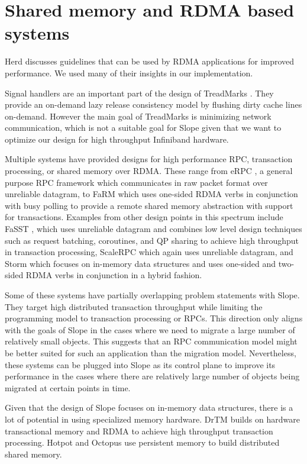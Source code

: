 \section{Shared memory and RDMA based systems}
Herd \cite{kalia2016designguidelines} discusses guidelines that can be
used by RDMA applications for improved performance. We used many of their
insights in our implementation.


Signal handlers are an important part of the design of TreadMarks
\cite{amza1996treadmarks}. They provide an on-demand lazy release
consistency model by flushing dirty cache lines on-demand. However the main
goal of TreadMarks is minimizing
network communication, which is not a suitable goal for Slope given that we
want to optimize our design for high throughput Infiniband hardware.

Multiple systems have provided designs
for high performance RPC, transaction processing, or shared memory over
RDMA. These range from eRPC \cite{kalia2019datacenter}, a general purpose
RPC framework which communicates in raw packet format over unreliable
datagram, to FaRM \cite{Dragojevic2014FaRM} which uses one-sided RDMA
verbs in conjunction with busy polling to provide a remote shared memory
abstraction with support for transactions. Examples from other design
points in this spectrum include FaSST \cite{kalia2016fasst}, which uses
unreliable datagram and combines low level design techniques such as
request batching, coroutines, and QP sharing to achieve high throughput
in transaction processing, ScaleRPC \cite{ScaleRPC2019} which again uses unreliable datagram,
and Storm \cite{novakovic2019storm} which
focuses on in-memory data structures and uses
one-sided and two-sided RDMA verbs in conjunction in a hybrid fashion.

Some of these systems have partially overlapping problem statements with
Slope. They target high distributed transaction throughput while limiting
the programming model to transaction processing or RPCs.
This direction only aligns with the goals of Slope in the cases where we
need to migrate a large number of relatively small objects. This suggests
that an RPC communication model might be better suited for such an
application than the migration model. Nevertheless, these systems
can be plugged into Slope as its control plane to improve its performance
in the cases where there are relatively large number of objects being
migrated at certain points in time.

Given that the design of Slope focuses on in-memory data structures, there
is a lot of potential in using specialized memory hardware. DrTM
\cite{drtm2017} builds on hardware transactional memory and RDMA
to achieve high throughput transaction processing.
Hotpot \cite{Shan2017distributed} and Octopus \cite{Lu2017rdmadistributed}
use persistent memory to build distributed shared memory.

